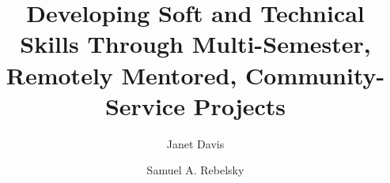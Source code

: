 \documentclass[sigconf]{acmart}
\begin{document}
\title[Multi-semester, remotely mentored, community service projects]{Developing Soft and Technical Skills Through Multi-Semester, Remotely Mentored, Community-Service Projects}

\author{Janet Davis}

\author{Samuel A. Rebelsky}







\maketitle

\newcommand{\college}{Grinnell}






 
\end{document}
